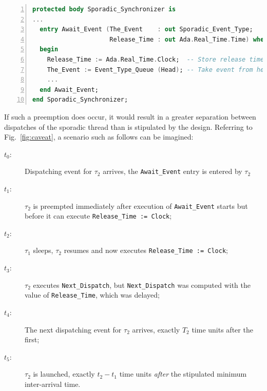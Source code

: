 \begin{lstlisting}[label=lst:caveat,language=ada,numbers=left,caption=Semantic caveat
    in sporadic task release due to non-atomic release and time calculation]
protected body Sporadic_Synchronizer is
...
  entry Await_Event (The_Event    : out Sporadic_Event_Type; 
                     Release_Time : out Ada.Real_Time.Time) when Event_Present is
  begin
    Release_Time := Ada.Real_Time.Clock;  -- Store release time --
    The_Event := Event_Type_Queue (Head); -- Take event from head of event queue --
    ...
  end Await_Event;
end Sporadic_Synchronizer;
\end{lstlisting}

If such a preemption does occur, it would result in a greater
separation between dispatches of the sporadic thread than is
stipulated by the design. Referring to Fig.~\ref{fig:caveat}, a
scenario such as follows can be imagined:

\begin{description}
\item[$t_0$:]{Dispatching event for $\tau_2$ arrives, the
  \texttt{Await\_Event} entry is entered by $\tau_2$}
\item[$t_1$:]{$\tau_2$ is preempted immediately after execution of
  \texttt{Await\_Event} starts but before it can execute
  \texttt{Release\_Time := Clock};}
\item[$t_2$:]{$\tau_1$ sleeps, $\tau_2$ resumes and now executes
  \texttt{Release\_Time := Clock};}
\item[$t_3$:]{$\tau_2$ executes \texttt{Next\_Dispatch}, but \texttt{Next\_Dispatch} was computed
  with the value of \texttt{Release\_Time}, which was delayed;}
\item[$t_4$:]{The next dispatching event for $\tau_2$ arrives, exactly
  $T_2$ time units after the first;}
\item[$t_5$:]{$\tau_2$ is launched, exactly $t_2 - t_1$ time units
  \emph{after} the stipulated minimum inter-arrival time.}
\end{description}

